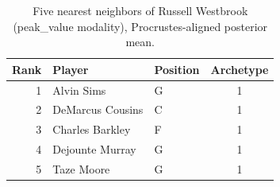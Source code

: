 \begin{table}[htbp]
  \centering\small
  \begin{tabular}{rllc}
    \toprule
    Rank & Player & Position & Archetype \\
    \midrule
    1 & Alvin Sims & G & 1 \\
    2 & DeMarcus Cousins & C & 1 \\
    3 & Charles Barkley & F & 1 \\
    4 & Dejounte Murray & G & 1 \\
    5 & Taze Moore & G & 1 \\
    \bottomrule
  \end{tabular}
  \caption{Five nearest neighbors of Russell Westbrook (peak_value modality), Procrustes-aligned posterior mean.}
  \label{tab:Russell_Westbrook_neighbors_peak_value}
\end{table}

